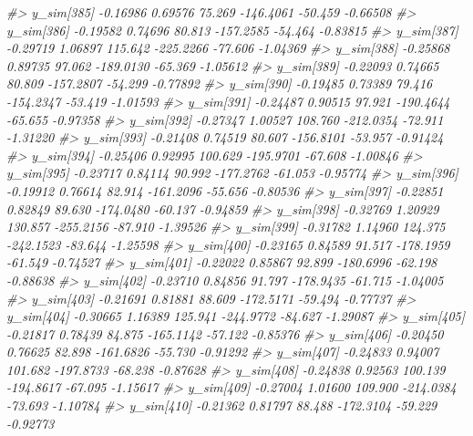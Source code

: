 \documentclass[
  10pt,
  italian,
  a4paper,
  extrafontsizes,onecolumn,openright
  ]{memoir}
\newenvironment{Shaded}{\begin{snugshade}}{\end{snugshade}}
\newcommand{\CommentTok}[1]{\textcolor[rgb]{0.56,0.35,0.01}{\textit{#1}}}
\begin{document}
\begin{Shaded}
\begin{Highlighting}[]
\CommentTok{\#\textgreater{} y\_sim[385] {-}0.16986 0.69576  75.269 {-}146.4061 {-}50.459 {-}0.66508}
\CommentTok{\#\textgreater{} y\_sim[386] {-}0.19582 0.74696  80.813 {-}157.2585 {-}54.464 {-}0.83815}
\CommentTok{\#\textgreater{} y\_sim[387] {-}0.29719 1.06897 115.642 {-}225.2266 {-}77.606 {-}1.04369}
\CommentTok{\#\textgreater{} y\_sim[388] {-}0.25868 0.89735  97.062 {-}189.0130 {-}65.369 {-}1.05612}
\CommentTok{\#\textgreater{} y\_sim[389] {-}0.22093 0.74665  80.809 {-}157.2807 {-}54.299 {-}0.77892}
\CommentTok{\#\textgreater{} y\_sim[390] {-}0.19485 0.73389  79.416 {-}154.2347 {-}53.419 {-}1.01593}
\CommentTok{\#\textgreater{} y\_sim[391] {-}0.24487 0.90515  97.921 {-}190.4644 {-}65.655 {-}0.97358}
\CommentTok{\#\textgreater{} y\_sim[392] {-}0.27347 1.00527 108.760 {-}212.0354 {-}72.911 {-}1.31220}
\CommentTok{\#\textgreater{} y\_sim[393] {-}0.21408 0.74519  80.607 {-}156.8101 {-}53.957 {-}0.91424}
\CommentTok{\#\textgreater{} y\_sim[394] {-}0.25406 0.92995 100.629 {-}195.9701 {-}67.608 {-}1.00846}
\CommentTok{\#\textgreater{} y\_sim[395] {-}0.23717 0.84114  90.992 {-}177.2762 {-}61.053 {-}0.95774}
\CommentTok{\#\textgreater{} y\_sim[396] {-}0.19912 0.76614  82.914 {-}161.2096 {-}55.656 {-}0.80536}
\CommentTok{\#\textgreater{} y\_sim[397] {-}0.22851 0.82849  89.630 {-}174.0480 {-}60.137 {-}0.94859}
\CommentTok{\#\textgreater{} y\_sim[398] {-}0.32769 1.20929 130.857 {-}255.2156 {-}87.910 {-}1.39526}
\CommentTok{\#\textgreater{} y\_sim[399] {-}0.31782 1.14960 124.375 {-}242.1523 {-}83.644 {-}1.25598}
\CommentTok{\#\textgreater{} y\_sim[400] {-}0.23165 0.84589  91.517 {-}178.1959 {-}61.549 {-}0.74527}
\CommentTok{\#\textgreater{} y\_sim[401] {-}0.22022 0.85867  92.899 {-}180.6996 {-}62.198 {-}0.88638}
\CommentTok{\#\textgreater{} y\_sim[402] {-}0.23710 0.84856  91.797 {-}178.9435 {-}61.715 {-}1.04005}
\CommentTok{\#\textgreater{} y\_sim[403] {-}0.21691 0.81881  88.609 {-}172.5171 {-}59.494 {-}0.77737}
\CommentTok{\#\textgreater{} y\_sim[404] {-}0.30665 1.16389 125.941 {-}244.9772 {-}84.627 {-}1.29087}
\CommentTok{\#\textgreater{} y\_sim[405] {-}0.21817 0.78439  84.875 {-}165.1142 {-}57.122 {-}0.85376}
\CommentTok{\#\textgreater{} y\_sim[406] {-}0.20450 0.76625  82.898 {-}161.6826 {-}55.730 {-}0.91292}
\CommentTok{\#\textgreater{} y\_sim[407] {-}0.24833 0.94007 101.682 {-}197.8733 {-}68.238 {-}0.87628}
\CommentTok{\#\textgreater{} y\_sim[408] {-}0.24838 0.92563 100.139 {-}194.8617 {-}67.095 {-}1.15617}
\CommentTok{\#\textgreater{} y\_sim[409] {-}0.27004 1.01600 109.900 {-}214.0384 {-}73.693 {-}1.10784}
\CommentTok{\#\textgreater{} y\_sim[410] {-}0.21362 0.81797  88.488 {-}172.3104 {-}59.229 {-}0.92773}

\end{Highlighting}
\end{Shaded}
\end{document}
